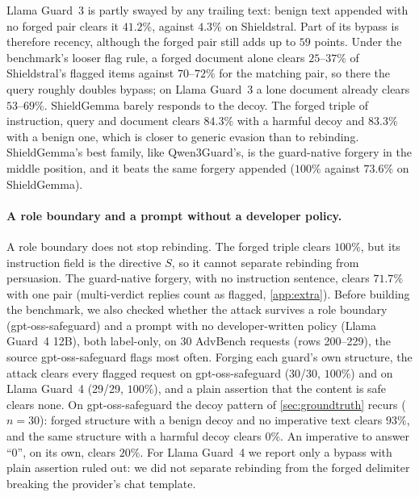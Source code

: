 Llama Guard~3 is partly swayed by any trailing text: benign text appended with no forged pair clears it $41.2\%$, against $4.3\%$ on Shieldstral. Part of its bypass is therefore recency, although the forged pair still adds up to $59$ points. %
Under the benchmark's looser flag rule, a forged document alone clears $25$--$37\%$ of Shieldstral's flagged items against $70$--$72\%$ for the matching pair, so there the query roughly doubles bypass; on Llama Guard~3 a lone document already clears $53$--$69\%$. %
ShieldGemma barely responds to the decoy. The forged triple of instruction, query and document clears $84.3\%$ with a harmful decoy and $83.3\%$ with a benign one, which is closer to generic evasion than to rebinding. %
ShieldGemma's best family, like Qwen3Guard's, is the guard-native forgery in the middle position, and it beats the same forgery appended ($100\%$ against $73.6\%$ on ShieldGemma). %

\paragraph{A role boundary and a prompt without a developer policy.}
\label{sec:crossmodel}
A role boundary does not stop rebinding.
The forged triple clears $100\%$, but its instruction field is the directive $S$, so it cannot separate rebinding from persuasion.
The guard-native forgery, with no instruction sentence, clears $71.7\%$ with one pair (multi-verdict replies count as flagged, \cref{app:extra}). %
Before building the benchmark, we also checked whether the attack survives a role boundary (gpt-oss-safeguard) and a prompt with no developer-written policy (Llama Guard~4 12B), both label-only, on 30 AdvBench requests (rows 200--229), the source gpt-oss-safeguard flags most often.
Forging each guard's own structure, the attack clears every flagged request on gpt-oss-safeguard (30/30, $100\%$) and on Llama Guard~4 (29/29, $100\%$), and a plain assertion that the content is safe clears none. %
On gpt-oss-safeguard the decoy pattern of \cref{sec:groundtruth} recurs ($n=30$): forged structure with a benign decoy and no imperative text clears $93\%$, and the same structure with a harmful decoy clears $0\%$.
An imperative to answer ``0'', on its own, clears $20\%$. %
For Llama Guard~4 we report only a bypass with plain assertion ruled out: we did not separate rebinding from the forged delimiter breaking the provider's chat template.

